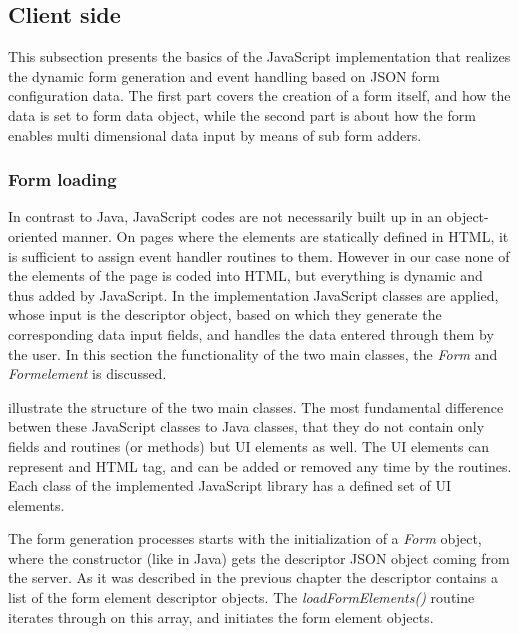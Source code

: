 \subsection{Client side}

This subsection presents the basics of the JavaScript implementation that realizes the dynamic form generation and event handling based on JSON form configuration data. The first part covers the creation of a form itself, and how the data is set to form data object, while the second part is about how the form enables multi dimensional data input by means of sub form adders.
 

\subsubsection{Form loading}

In contrast to Java, JavaScript codes are not necessarily built up in an object-oriented manner. On pages where the elements are statically defined in HTML, it is sufficient to assign event handler routines to them. However in our case none of the elements of the page is coded into HTML, but everything is dynamic and thus added by JavaScript. In the implementation JavaScript classes are applied, whose input is the descriptor object, based on which they generate the corresponding data input fields, and handles the data entered through them by the user. In this section the functionality of the two main classes, the \textit{Form} and \textit{Formelement} is discussed.  


 illustrate the structure of the two main classes. The most fundamental difference betwen these JavaScript classes to Java classes, that they do not contain only fields and routines (or methods) but UI elements as well. The UI elements can represent and HTML tag, and can be added or removed any time by the routines. Each class of the implemented JavaScript library has a defined set of UI elements. 

The form generation processes starts with the initialization of a \textit{Form} object, where the constructor (like in Java) gets the descriptor JSON object coming from the server. As it was described in the previous chapter the descriptor contains a list of the form element descriptor objects. The \textit{loadFormElements()} routine iterates through on this array, and initiates the form element objects.

